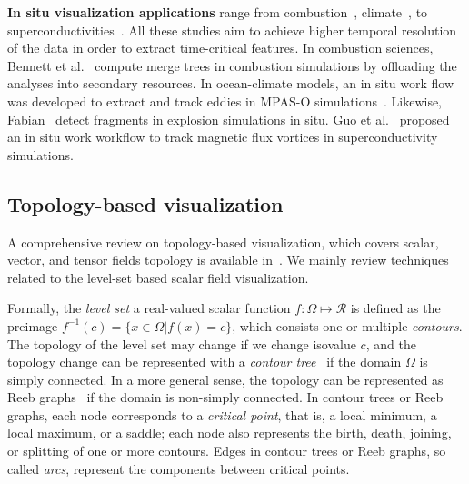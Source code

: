 

{\bf In situ visualization applications} range from combustion~\cite{YuWGCM10, BennettABGGJKKPPPTYZC12}, climate~\cite{WoodringPSPAH16}, to superconductivities~\cite{GuoPG17}.  All these studies aim to achieve higher temporal resolution of the data in order to extract time-critical features.
In combustion sciences, Bennett et al.~\cite{BennettABGGJKKPPPTYZC12} compute merge trees in combustion simulations by offloading the analyses into secondary resources.  
In ocean-climate models, an in situ work flow was developed to extract and track eddies in MPAS-O simulations~\cite{WoodringPSPAH16}.  
Likewise, Fabian~\cite{Fabian12} detect fragments in explosion simulations in situ.  
Guo et al.~\cite{GuoPG17} proposed an in situ work workflow to track magnetic flux vortices in superconductivity simulations.  





\subsection{Topology-based visualization}
\label{sec:topology}

A comprehensive review on topology-based visualization, which covers scalar, vector, and tensor fields topology is available in~\cite{HeineLHIFSHG16}.  We mainly review techniques related to the level-set based scalar field visualization.  

Formally, the \emph{level set} a real-valued scalar function $f: \Omega\mapsto\mathcal{R}$ is defined as the preimage $f^{-1}(c) = \{x\in\Omega | f(x) = c \}$, which consists one or multiple \emph{contours}.  The topology of the level set may change if we change isovalue $c$, and the topology change can be represented with a \emph{contour tree}~\cite{} if the domain $\Omega$ is simply connected.  In a more general sense, the topology can be represented as Reeb graphs~\cite{Reeb46} if the domain is non-simply connected.  In contour trees or Reeb graphs, each node corresponds to a \emph{critical point}, that is, a local minimum, a local maximum, or a saddle; each node also represents the birth, death, joining, or splitting of one or more contours.  Edges in contour trees or Reeb graphs, so called \emph{arcs}, represent the components between critical points. 

